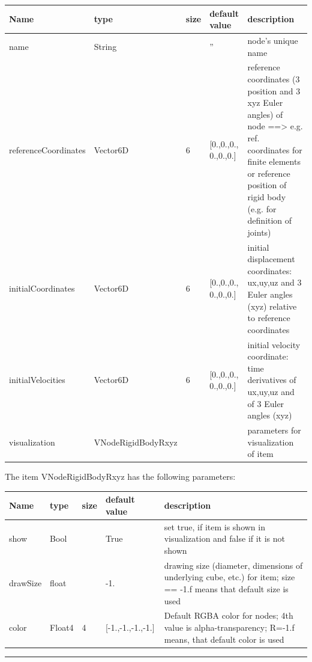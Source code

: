 \begin{center}
  \footnotesize
  \begin{longtable}{| p{4.5cm} | p{2.5cm} | p{0.5cm} | p{2.5cm} | p{6cm} |}
    \hline
    \bf Name & \bf type & \bf size & \bf default value & \bf description \\ \hline
    name &     String &      &     '' &     node's unique name\\ \hline
    referenceCoordinates &     Vector6D &     6 &     [0.,0.,0., 0.,0.,0.] &     reference coordinates (3 position and 3 xyz Euler angles) of node ==> e.g. ref. coordinates for finite elements or reference position of rigid body (e.g. for definition of joints)\\ \hline
    initialCoordinates &     Vector6D &     6 &     [0.,0.,0., 0.,0.,0.] &     initial displacement coordinates: ux,uy,uz and 3 Euler angles (xyz) relative to reference coordinates\\ \hline
    initialVelocities &     Vector6D &     6 &     [0.,0.,0., 0.,0.,0.] &     initial velocity coordinate: time derivatives of ux,uy,uz and of 3 Euler angles (xyz)\\ \hline
    visualization & VNodeRigidBodyRxyz & & & parameters for visualization of item \\ \hline
	  \end{longtable}
	\end{center}
The item VNodeRigidBodyRxyz has the following parameters:\vspace{-1cm}\\ 
\begin{center}
  \footnotesize
  \begin{longtable}{| p{4.5cm} | p{2.5cm} | p{0.5cm} | p{2.5cm} | p{6cm} |}
    \hline
    \bf Name & \bf type & \bf size & \bf default value & \bf description \\ \hline
    show &     Bool &      &     True &     set true, if item is shown in visualization and false if it is not shown\\ \hline
    drawSize &     float &      &     -1. &     drawing size (diameter, dimensions of underlying cube, etc.)  for item; size == -1.f means that default size is used\\ \hline
    color &     Float4 &     4 &     [-1.,-1.,-1.,-1.] &     Default RGBA color for nodes; 4th value is alpha-transparency; R=-1.f means, that default color is used\\ \hline
	  \end{longtable}
	\end{center}
\par\noindent\rule{\textwidth}{0.4pt}
\label{description_NodeRigidBodyRxyz}

